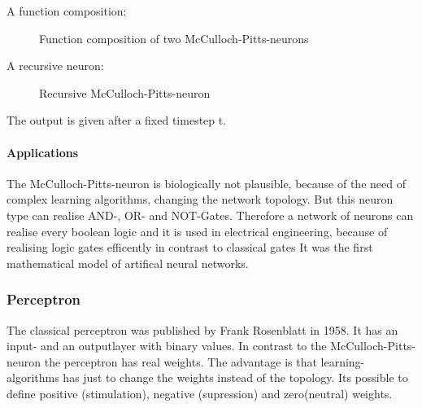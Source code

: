 \documentclass[10pt,a4paper,DIV=11]{scrreprt}
\begin{document}
A function composition:

\begin{figure}
	\centering
	\caption{Function composition of two McCulloch-Pitts-neurons}
	\label{fig:pitts2}
\end{figure}

A recursive neuron:

\begin{figure}
	\centering
	\caption{Recursive McCulloch-Pitts-neuron}
	\label{fig:pitts3}
\end{figure}

The output is given after a fixed timestep t.

\paragraph{Applications}
The McCulloch-Pitts-neuron is biologically not plausible, because of
the need of complex learning algorithms, changing the network topology.
But this neuron type can realise AND-, OR- and NOT-Gates.
Therefore a network of neurons can realise every boolean logic and it is used in electrical engineering, because of realising logic gates efficently in contrast to classical gates
It was the first mathematical model of artifical neural networks.\cite{NEURONMATH}


\subsubsection{Perceptron}
The classical perceptron was published by Frank Rosenblatt in 1958.
It has an input- and an outputlayer with binary values. In contrast to the McCulloch-Pitts-neuron
the perceptron has real weights. The advantage is that learning-algorithms has just to change the weights
instead of the topology. Its possible to define positive (stimulation), negative (supression) and zero(neutral) weights.
\end{document}
